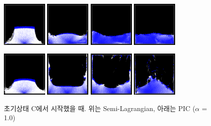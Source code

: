 \documentclass[11pt, A4]{article}
\begin{document}
\clearpage

\begin{figure}[h!]
  \centering
\includegraphics[width=0.20\textwidth]{semilag-state-c/img11}
\includegraphics[width=0.20\textwidth]{semilag-state-c/img2}
\includegraphics[width=0.20\textwidth]{semilag-state-c/img3}
\includegraphics[width=0.20\textwidth]{semilag-state-c/img4}

\includegraphics[width=0.20\textwidth]{pic-state-c/img1}
\includegraphics[width=0.20\textwidth]{pic-state-c/img2}
\includegraphics[width=0.20\textwidth]{pic-state-c/img3}
\includegraphics[width=0.20\textwidth]{pic-state-c/img4}
  \caption{초기상태 C에서 시작했을 때. 위는 Semi-Lagrangian, 아래는 PIC ($\alpha$ = 1.0)}
  \label{fluid-c}
\end{figure}
\end{document}
